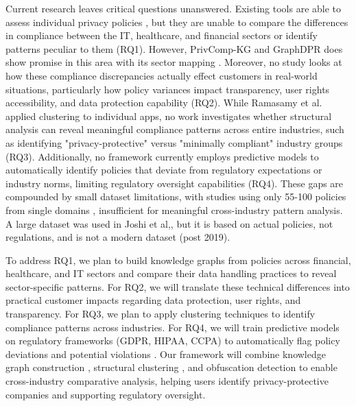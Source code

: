 \documentclass[conference]{IEEEtran}
\begin{document}
Current research leaves critical questions unanswered. Existing tools are able to assess individual privacy policies \cite{cui2023, ramasamy2025, barrett2025}, but they are unable to compare the differences in compliance between the IT, healthcare, and financial sectors or identify patterns peculiar to them (RQ1). However, PrivComp-KG and GraphDPR does show promise in this area with its sector mapping \cite{garza2024} \cite{Chowdhury2026}. Moreover, no study looks at how these compliance discrepancies actually effect customers in real-world situations, particularly how policy variances impact transparency, user rights accessibility, and data protection capability (RQ2).
While Ramasamy et al. \cite{ramasamy2025} applied clustering to individual apps, no work investigates whether structural analysis can reveal meaningful compliance patterns across entire industries, such as identifying "privacy-protective" versus "minimally compliant" industry groups (RQ3). Additionally, no framework currently employs predictive models to automatically identify policies that deviate from regulatory expectations or industry norms, limiting regulatory oversight capabilities (RQ4). These gaps are compounded by small dataset limitations, with studies using only 55-100 policies from single domains \cite{ramasamy2025, barrett2025}, insufficient for meaningful cross-industry pattern analysis. A large dataset was used in Joshi et al,, but it is based on actual policies, not regulations, and is not a modern dataset (post 2019). \cite{joshi2020} 

To address RQ1, we plan to build knowledge graphs from policies across financial, healthcare, and IT sectors and compare their data handling practices to reveal sector-specific patterns. For RQ2, we will translate these technical differences into practical customer impacts regarding data protection, user rights, and transparency. For RQ3, we plan to apply clustering techniques \cite{ramasamy2025} to identify compliance patterns across industries. For RQ4, we will train predictive models on regulatory frameworks (GDPR, HIPAA, CCPA) to automatically flag policy deviations and potential violations \cite{yerby2022}. Our framework will combine knowledge graph construction \cite{cui2023, barrett2025}, structural clustering \cite{ramasamy2025}, and obfuscation detection \cite{yerby2022} to enable cross-industry comparative analysis, helping users identify privacy-protective companies and supporting regulatory oversight.





\end{document}

